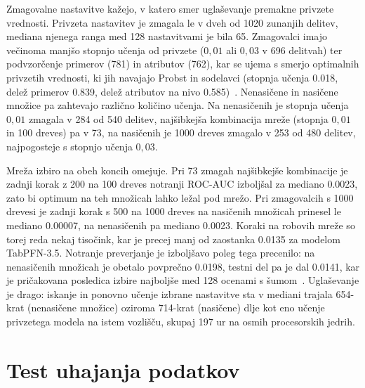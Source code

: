 \documentclass[a4paper,12pt,openright]{book}
\begin{document}
Zmagovalne nastavitve kažejo, v katero smer uglaševanje premakne privzete
vrednosti. Privzeta nastavitev je zmagala le v dveh od 1020 zunanjih delitev,
mediana njenega ranga med 128 nastavitvami je bila 65. Zmagovalci imajo
večinoma manjšo stopnjo učenja od privzete ($0{,}01$ ali $0{,}03$ v 696
delitvah) ter podvzorčenje primerov (781) in atributov (762), kar se ujema s
smerjo optimalnih privzetih vrednosti, ki jih navajajo Probst in sodelavci
(stopnja učenja \num{0.018}, delež primerov \num{0.839}, delež atributov na
nivo \num{0.585})~\cite{probst2019tunability}. Nenasičene in nasičene množice
pa zahtevajo različno količino učenja. Na nenasičenih je stopnja učenja
$0{,}01$ zmagala v 284 od 540 delitev, najšibkejša kombinacija mreže (stopnja
$0{,}01$ in 100 dreves) pa v 73, na nasičenih je 1000 dreves zmagalo v 253 od
480 delitev, najpogosteje s stopnjo učenja $0{,}03$.

Mreža izbiro na obeh koncih omejuje. Pri 73 zmagah najšibkejše kombinacije je
zadnji korak z 200 na 100 dreves notranji ROC-AUC izboljšal za mediano
\num{0.0023}, zato bi optimum na teh množicah lahko ležal pod mrežo. Pri
zmagovalcih s 1000 drevesi je zadnji korak s 500 na 1000 dreves na nasičenih
množicah prinesel le mediano \num{0.00007}, na nenasičenih pa mediano
\num{0.0023}. Koraki na robovih mreže so torej reda nekaj tisočink, kar je
precej manj od zaostanka \num{0.0135} za modelom TabPFN-3.5. Notranje
preverjanje je izboljšavo poleg tega precenilo: na nenasičenih množicah je
obetalo povprečno \num{0.0198}, testni del pa je dal \num{0.0141}, kar je
pričakovana posledica izbire najboljše med 128 ocenami s
šumom~\cite{cawley2010over}. Uglaševanje je drago: iskanje in ponovno učenje
izbrane nastavitve sta v mediani trajala 654-krat (nenasičene množice)
oziroma 714-krat (nasičene) dlje kot eno učenje privzetega modela na istem
vozlišču, skupaj \num{197} ur na osmih procesorskih jedrih.

\section{Test uhajanja podatkov}
\label{sec:rez-uhajanje}
\end{document}
